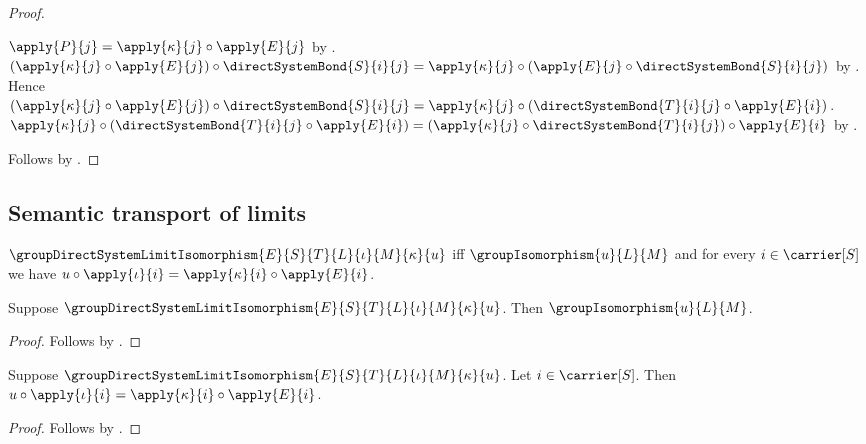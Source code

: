 \begin{proof}
\begin{subproof}
            $\apply{P}{j}=\apply{\kappa}{j}\circ\apply{E}{j}$ by
            .
        $(\apply{\kappa}{j}\circ\apply{E}{j})\circ
            \directSystemBond{S}{i}{j}
            =\apply{\kappa}{j}\circ
                (\apply{E}{j}\circ\directSystemBond{S}{i}{j})$ by
            .
        Hence $(\apply{\kappa}{j}\circ\apply{E}{j})\circ
            \directSystemBond{S}{i}{j}
            =\apply{\kappa}{j}\circ
                (\directSystemBond{T}{i}{j}\circ\apply{E}{i})$.
        $\apply{\kappa}{j}\circ
            (\directSystemBond{T}{i}{j}\circ\apply{E}{i})
            =(\apply{\kappa}{j}\circ\directSystemBond{T}{i}{j})
                \circ\apply{E}{i}$ by
            .
    \end{subproof}
    Follows by .
\end{proof}

\subsection{Semantic transport of limits}

\begin{definition}\label{group_direct_system_limit_isomorphism}
    $\groupDirectSystemLimitIsomorphism
        {E}{S}{T}{L}{\iota}{M}{\kappa}{u}$ iff
        $\groupIsomorphism{u}{L}{M}$ and
        for every $i\in\carrier[S]$ we have
            $u\circ\apply{\iota}{i}
                =\apply{\kappa}{i}\circ\apply{E}{i}$.
\end{definition}

\begin{proposition}\label{group_direct_system_limit_isomorphism_is_iso}
    Suppose $\groupDirectSystemLimitIsomorphism
        {E}{S}{T}{L}{\iota}{M}{\kappa}{u}$.
    Then $\groupIsomorphism{u}{L}{M}$.
\end{proposition}
\begin{proof}
    Follows by .
\end{proof}

\begin{proposition}\label{group_direct_system_limit_isomorphism_compatibility}
    Suppose $\groupDirectSystemLimitIsomorphism
        {E}{S}{T}{L}{\iota}{M}{\kappa}{u}$.
    Let $i\in\carrier[S]$.
    Then $u\circ\apply{\iota}{i}
        =\apply{\kappa}{i}\circ\apply{E}{i}$.
\end{proposition}
\begin{proof}
    Follows by .
\end{proof}

